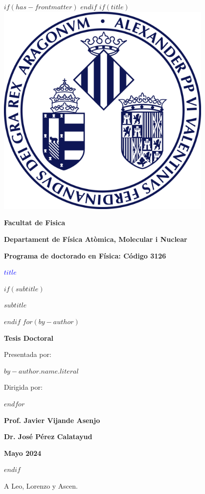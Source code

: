 $if(has-frontmatter)$
\frontmatter
$endif$
$if(title)$
\thispagestyle{empty}
\centering
\vspace*{-1cm} %
\includegraphics[width=0.8\textwidth]{logouni} %
\vfill
{\Large\bfseries Facultat de Fisica \par}
{\Large\bfseries Departament de Física Atòmica, Molecular i Nuclear \par}
{\Large\bfseries Programa de doctorado en Física: Código 3126 \par}
{\textcolor{blue}{\Huge\bfseries $title$} \par}
$if(subtitle)$
\vspace{3ex}
{\Large\bfseries $subtitle$ \par}
$endif$
\vspace{3ex}
$for(by-author)$
{\Large\bfseries Tesis Doctoral \par}
{\Large Presentada por: \par}
{\Large\bfseries $by-author.name.literal$ \par}
{\Large Dirigida por: \par}
\vspace{3ex}
$endfor$%
\begin{minipage}[t]{0.4\textwidth}
    \centering
    {\Large\bfseries Prof. Javier Vijande Asenjo \par}
\end{minipage}
\hfill
\begin{minipage}[t]{0.4\textwidth}
    \centering
    {\Large\bfseries Dr. José Pérez Calatayud \par}
\end{minipage}

\vfill %

{\bfseries\large Mayo 2024 \par}
\raggedright
$endif$

\newpage
\thispagestyle{empty}
\begin{flushright}
A Leo, Lorenzo y Ascen.
\end{flushright}

